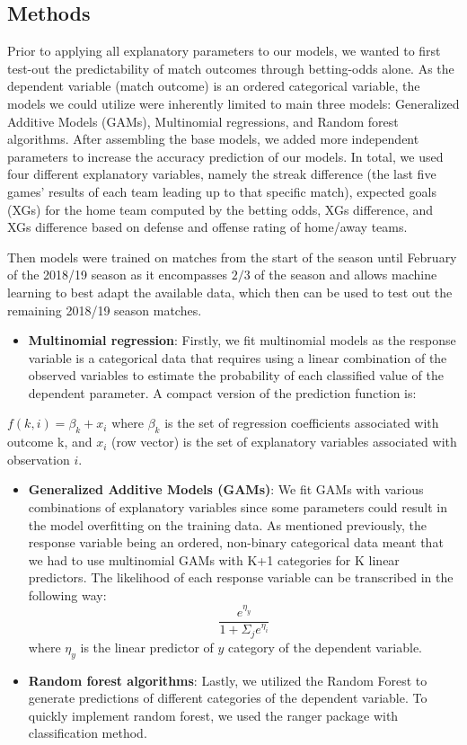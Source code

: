\documentclass[
]{article}
\providecommand{\tightlist}{%
  \setlength{\itemsep}{0pt}\setlength{\parskip}{0pt}}
\begin{document}
\hypertarget{methods}{%
\subsection{Methods}\label{methods}}

Prior to applying all explanatory parameters to our models, we wanted to
first test-out the predictability of match outcomes through betting-odds
alone. As the dependent variable (match outcome) is an ordered
categorical variable, the models we could utilize were inherently
limited to main three models: Generalized Additive Models (GAMs),
Multinomial regressions, and Random forest algorithms. After assembling
the base models, we added more independent parameters to increase the
accuracy prediction of our models. In total, we used four different
explanatory variables, namely the streak difference (the last five
games' results of each team leading up to that specific match), expected
goals (XGs) for the home team computed by the betting odds, XGs
difference, and XGs difference based on defense and offense rating of
home/away teams.

Then models were trained on matches from the start of the season until
February of the 2018/19 season as it encompasses \(2/3\) of the season
and allows machine learning to best adapt the available data, which then
can be used to test out the remaining 2018/19 season matches.

\begin{itemize}
\tightlist
\item
  \textbf{Multinomial regression}: Firstly, we fit multinomial models as
  the response variable is a categorical data that requires using a
  linear combination of the observed variables to estimate the
  probability of each classified value of the dependent parameter. A
  compact version of the prediction function is:
\end{itemize}

\(f(k, i) = \beta_k + x_i\) where \(\beta_k\) is the set of regression
coefficients associated with outcome k, and \(x_i\) (row vector) is the
set of explanatory variables associated with observation \(i\).

\begin{itemize}
\item
  \textbf{Generalized Additive Models (GAMs)}: We fit GAMs with various
  combinations of explanatory variables since some parameters could
  result in the model overfitting on the training data. As mentioned
  previously, the response variable being an ordered, non-binary
  categorical data meant that we had to use multinomial GAMs with K+1
  categories for K linear predictors. The likelihood of each response
  variable can be transcribed in the following way:
  \[\frac{e^{\eta_y}}{1 + \Sigma_j e^{\eta_i}}\] where \(\eta_y\) is the
  linear predictor of \(y\) category of the dependent variable.
\item
  \textbf{Random forest algorithms}: Lastly, we utilized the Random
  Forest to generate predictions of different categories of the
  dependent variable. To quickly implement random forest, we used the
  ranger package with classification method.
\end{itemize}
\end{document}
